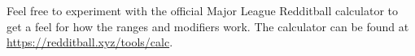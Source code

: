 
Feel free to experiment with the official Major League Redditball calculator
to get a feel for how the ranges and modifiers work.
The calculator can be found at \url{https://redditball.xyz/tools/calc}.



\pagebreak


\pagebreak

